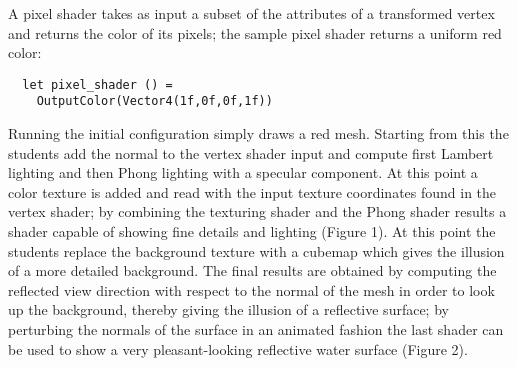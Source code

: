 A pixel shader takes as input a subset of the attributes of a transformed vertex and returns the color of its pixels; the sample pixel shader returns a uniform red color:

\begin{lstlisting}
  let pixel_shader () =
    OutputColor(Vector4(1f,0f,0f,1f)) 
\end{lstlisting}

Running the initial configuration simply draws a red mesh. Starting from this the students add the normal to the vertex shader input and compute first Lambert lighting and then Phong lighting with a specular component. At this point a color texture is added and read with the input texture coordinates found in the vertex shader; by combining the texturing shader and the Phong shader results a shader capable of showing fine details and lighting (Figure 1). At this point the students replace the background texture with a cubemap which gives the illusion of a more detailed background. The final results are obtained by computing the reflected view direction with respect to the normal of the mesh in order to look up the background, thereby giving the illusion of a reflective surface; by perturbing the normals of the surface in an animated fashion the last shader can be used to show a very pleasant-looking reflective water surface (Figure 2).
